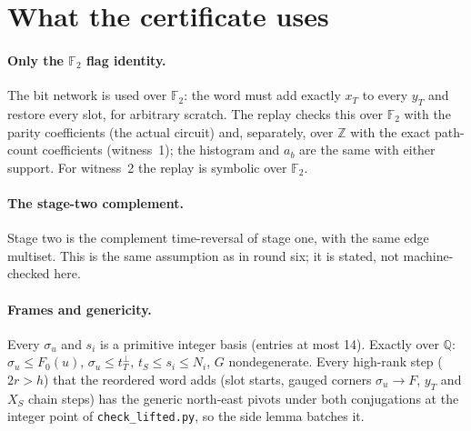 \documentclass[11pt]{article}
\theoremstyle{remark}\newtheorem*{remark}{Remark}
\begin{document}
\section{What the certificate uses}\label{sec:uses}
\paragraph{Only the $\mathbb F_2$ flag identity.} The bit network is used over $\mathbb F_2$: the word must add exactly
$x_T$ to every $y_T$ and restore every slot, for arbitrary scratch. The replay checks this over $\mathbb F_2$ with
the parity coefficients (the actual circuit) and, separately, over $\mathbb Z$ with the exact path-count
coefficients (witness~1); the histogram and $a_b$ are the same with either support. For witness~2 the replay is
symbolic over $\mathbb F_2$.

\paragraph{The stage-two complement.} Stage two is the complement time-reversal of stage one, with the same edge
multiset. This is the same assumption as in round six; it is stated, not machine-checked here.

\paragraph{Frames and genericity.} Every $\sigma_u$ and $s_i$ is a primitive integer basis (entries at most 14).
Exactly over $\mathbb Q$: $\sigma_u\le F_0(u)$, $\sigma_u\le t_T^\perp$, $t_S\le s_i\le N_i$, $G$ nondegenerate. Every
high-rank step ($2r>h$) that the reordered word adds (slot starts, gauged corners $\sigma_u\to F$, $y_T$ and $X_S$
chain steps) has the generic north-east pivots under both conjugations at the integer point of
\texttt{check\_lifted.py}, so the side lemma batches it.
\end{document}
